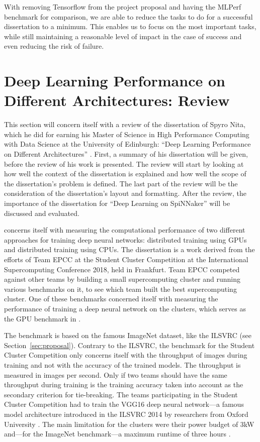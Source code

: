 \documentclass{article}
\begin{document}
With removing Tensorflow from the project proposal and
having the MLPerf benchmark for comparison, we are able
to reduce the tasks to do for a successful dissertation to
a minimum.
This enables us to focus on the most important tasks, while
still maintaining a reasonable level of impact in the case
of success and even reducing the risk of failure.


\section{Deep Learning Performance on Different %
  Architectures: Review}
\label{sec:review}

This section will concern itself with a review of the
dissertation of Spyro Nita, which he did for earning his
Master of Science in High Performance Computing with Data
Science at the University of Edinburgh:
``Deep Learning Performance on Different Architectures''
 \citep{nita_2018}.
First, a summary of his dissertation will be given, before
the review of his work is presented.
The review will start by looking at how well the context
of the dissertation is explained and how well the scope
of the dissertation's problem is defined.
The last part of the review will be the consideration of
the dissertation's layout and formatting.
After the review, the importance of the dissertation for
``Deep Learning on SpiNNaker'' will be discussed and
evaluated.

\citet{nita_2018} concerns itself with measuring the
computational performance of two different approaches for
training deep neural networks: distributed training using GPUs and
distributed training using CPUs.
The dissertation is a work derived from the efforts of
Team EPCC at the Student Cluster Competition at the
International Supercomputing Conference 2018, held in
Frankfurt.
Team EPCC competed against other teams by building a small
supercomputing cluster and running various
benchmarks on it, to see which team built the best
supercomputing cluster.
One of these benchmarks concerned itself with measuring the
performance of training a deep neural network on the
clusters, which serves as the GPU benchmark in \citet{nita_2018}.


The benchmark is based on the famous ImageNet dataset, like
the ILSVRC (see Section~\ref{sec:proposal}).
Contrary to the ILSVRC, the benchmark for the Student
Cluster Competition only concerns itself with the
throughput of images during training and not with the
accuracy of the trained models.
The throughput is measured in images per second.
Only if two teams should have the same throughput during
training is the training accuracy taken into account as
the secondary criterion for tie-breaking.
The teams participating in the Student Cluster Competition
had to train the VGG16 deep neural network---a famous
model architecture introduced in the ILSVRC 2014 by
researchers from Oxford University
\citep{simonyan_et_al_2014}.
The main limitation for the clusters were their power
budget of 3kW and---for the ImageNet benchmark---a maximum
runtime of three hours \citep{nita_2018}.
\end{document}
